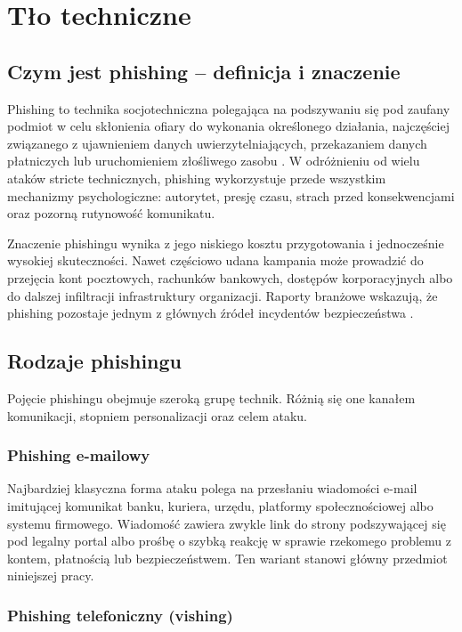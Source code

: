\documentclass[12pt,a4paper,openright]{report}
\begin{document}
\chapter{Tło techniczne}

\section{Czym jest phishing -- definicja i znaczenie}

Phishing to technika socjotechniczna polegająca na podszywaniu się pod zaufany podmiot w celu skłonienia ofiary do wykonania określonego działania, najczęściej związanego z ujawnieniem danych uwierzytelniających, przekazaniem danych płatniczych lub uruchomieniem złośliwego zasobu \cite{jagatic2007social}. W odróżnieniu od wielu ataków stricte technicznych, phishing wykorzystuje przede wszystkim mechanizmy psychologiczne: autorytet, presję czasu, strach przed konsekwencjami oraz pozorną rutynowość komunikatu.

Znaczenie phishingu wynika z jego niskiego kosztu przygotowania i jednocześnie wysokiej skuteczności. Nawet częściowo udana kampania może prowadzić do przejęcia kont pocztowych, rachunków bankowych, dostępów korporacyjnych albo do dalszej infiltracji infrastruktury organizacji. Raporty branżowe wskazują, że phishing pozostaje jednym z głównych źródeł incydentów bezpieczeństwa \cite{apwg2023,kaspersky2024}.

\section{Rodzaje phishingu}

Pojęcie phishingu obejmuje szeroką grupę technik. Różnią się one kanałem komunikacji, stopniem personalizacji oraz celem ataku.

\subsection{Phishing e-mailowy}

Najbardziej klasyczna forma ataku polega na przesłaniu wiadomości e-mail imitującej komunikat banku, kuriera, urzędu, platformy społecznościowej albo systemu firmowego. Wiadomość zawiera zwykle link do strony podszywającej się pod legalny portal albo prośbę o szybką reakcję w sprawie rzekomego problemu z kontem, płatnością lub bezpieczeństwem. Ten wariant stanowi główny przedmiot niniejszej pracy.

\subsection{Phishing telefoniczny (vishing)}
\end{document}
